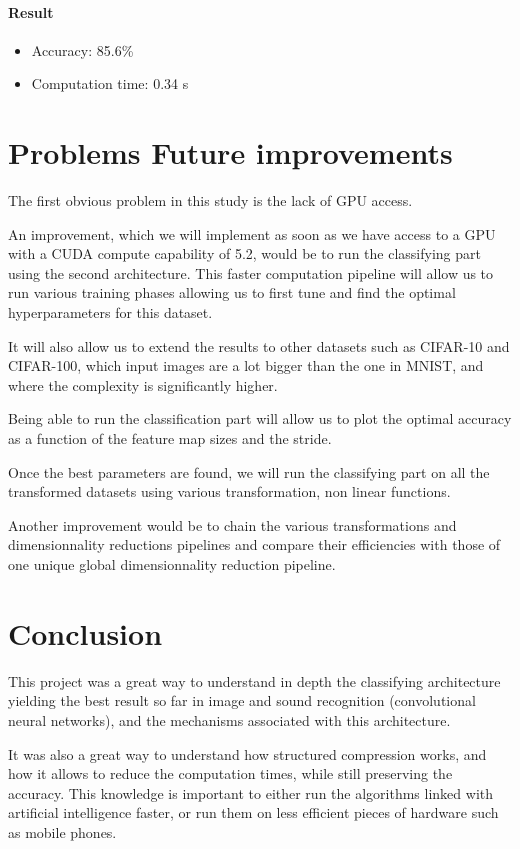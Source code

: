 \documentclass[11pt,a4paper]{article}
\begin{document}
		\paragraph{Result}
		\begin{itemize}
			\item Accuracy: 85.6\%
			\item Computation time: 0.34 s
		\end{itemize}
		
		
	
	
	\section{Problems Future improvements}
	The first obvious problem in this study is the lack of GPU access.
	
	
	An improvement, which we will implement as soon as we have access to a GPU with a CUDA compute capability of 5.2, would be to run the classifying part using the second architecture.
	This faster computation pipeline will allow us to run various training phases allowing us to first tune and find the optimal hyperparameters for this dataset.
	
	
	It will also allow us to extend the results to other datasets such as CIFAR-10 and CIFAR-100, which input images are a lot bigger than the one in MNIST, and where the complexity is significantly higher.
	
	
	Being able to run the classification part will allow us to plot the optimal accuracy as a function of the feature map sizes and the stride.
	
	
Once the best parameters are found, we will run the classifying part on all the transformed datasets using various transformation, non linear functions.
	
	Another improvement would be to chain the various transformations and dimensionnality reductions pipelines and compare their efficiencies with those of one unique global dimensionnality reduction pipeline.
	
	
	\section{Conclusion}
This project was a great way to understand in depth the classifying architecture yielding the best result so far in image and sound recognition (convolutional neural networks), and the mechanisms associated with this architecture.

It was also a great way to understand how structured compression works, and how it allows to reduce the computation times, while still preserving the accuracy. This knowledge is important to either run the algorithms linked with artificial intelligence faster, or run them on less efficient pieces of hardware such as mobile phones.
\end{document}
